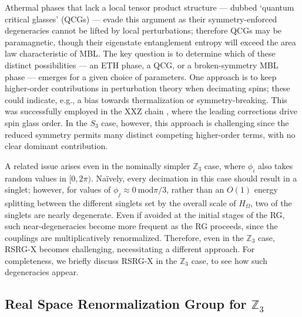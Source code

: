 \documentclass[prb,aps, twocolumn, superscriptaddress]{revtex4-1}
\begin{document}
\begin{appendix}
Athermal phases that lack a local tensor product structure   --- dubbed `quantum critical glasses' (QCGs)  --- evade this argument as their symmetry-enforced degeneracies cannot be  lifted by local perturbations; therefore QCGs may be paramagnetic, though their eigenstate entanglement entropy will exceed the area law characteristic of MBL. The key question is to determine which of these distinct possibilities --- an ETH phase, a QCG, or a broken-symmetry MBL phase --- emerges for a given choice of parameters. One  approach is to keep higher-order contributions in perturbation theory when decimating spins; these could indicate, e.g., a bias towards thermalization or symmetry-breaking. This was successfully employed in the XXZ chain\cite{XXZPaper}
, where the leading corrections drive spin glass order. In the $S_3$ case, however, this approach is challenging since the reduced symmetry permits many distinct competing higher-order terms, with no clear dominant contribution.

A related issue arises even in the  nominally simpler $\mathbb{Z}_3$ case, where $\phi_i$ also takes random values in $[0,2\pi)$. Na\"{i}vely, every decimation in this case should result in a singlet; however, for values of $\phi_j \approx 0 ~\text{mod}{\pi/3}$, rather than an $O(1)$ energy splitting between the different singlets set by the overall scale of $H_\Omega$, two of the singlets are nearly degenerate. Even if avoided at the initial stages of the RG, such near-degeneracies become more frequent as the RG proceeds, since the couplings are multiplicatively renormalized. Therefore, even in the $\mathbb{Z}_3$ case, RSRG-X becomes challenging, necessitating a different approach. For completeness, we briefly discuss RSRG-X in the $\mathbb{Z}_3$ case, to see how such degeneracies appear.

\subsection{Real Space Renormalization Group for $\mathbb{Z}_3$}


\end{appendix}
\end{document}
